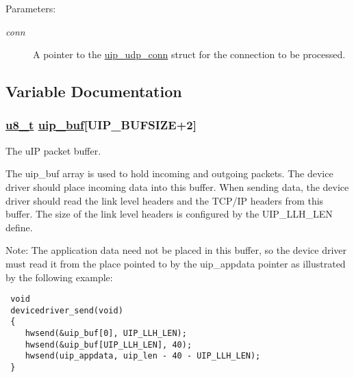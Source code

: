 \begin{Desc}
\item[Parameters:]
\begin{description}
\item[{\em conn}]A pointer to the \hyperlink{a00032}{uip\_\-udp\_\-conn} struct for the connection to be processed. \end{description}
\end{Desc}


\subsection{Variable Documentation}
\hypertarget{a00063_gb81e78f890dbbee50c533a9734b74fd9}{
\subsubsection[uip\_\-buf]{\setlength{\rightskip}{0pt plus 5cm}\hyperlink{a00070_ge081489b4906f65a3cb18e9fbe9f8d23}{u8\_\-t} \hyperlink{a00059_gb81e78f890dbbee50c533a9734b74fd9}{uip\_\-buf}\mbox{[}UIP\_\-BUFSIZE+2\mbox{]}}}
\label{a00063_gb81e78f890dbbee50c533a9734b74fd9}


The u\-IP packet buffer. 

The uip\_\-buf array is used to hold incoming and outgoing packets. The device driver should place incoming data into this buffer. When sending data, the device driver should read the link level headers and the TCP/IP headers from this buffer. The size of the link level headers is configured by the UIP\_\-LLH\_\-LEN define.

\begin{Desc}
\item[Note:]The application data need not be placed in this buffer, so the device driver must read it from the place pointed to by the uip\_\-appdata pointer as illustrated by the following example: 

\footnotesize\begin{verbatim} void
 devicedriver_send(void)
 {
    hwsend(&uip_buf[0], UIP_LLH_LEN);
    hwsend(&uip_buf[UIP_LLH_LEN], 40);
    hwsend(uip_appdata, uip_len - 40 - UIP_LLH_LEN);
 }
\end{verbatim}
\normalsize
 \end{Desc}
